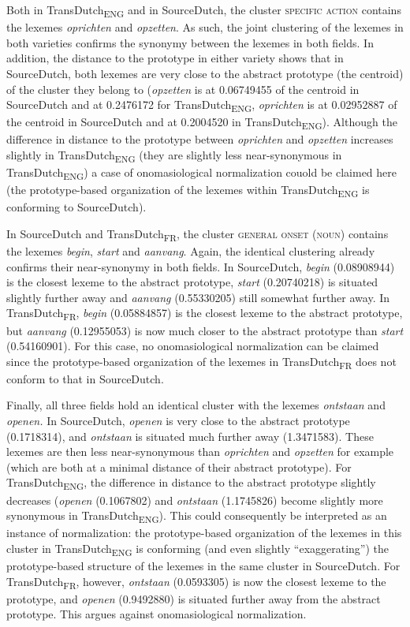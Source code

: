Both in TransDutch\textsubscript{ENG} and in SourceDutch, the cluster {\textsc{specific}} \textsc{action} contains the lexemes \textit{oprichten} and \textit{opzetten}. As such, the joint clustering of the lexemes in both varieties confirms the synonymy between the lexemes in both fields. In addition, the distance to the prototype in either variety shows that in SourceDutch, both lexemes are very close to the abstract prototype (the centroid) of the cluster they belong to (\textit{opzetten} is at 0.06749455 of the centroid in SourceDutch and at 0.2476172 for TransDutch\textsubscript{ENG}, \textit{oprichten} is at 0.02952887 of the centroid in SourceDutch and at 0.2004520 in TransDutch\textsubscript{ENG}). Although the difference in distance to the prototype between \textit{oprichten} and \textit{opzetten} increases slightly in TransDutch\textsubscript{ENG} (they are slightly less near-synonymous in TransDutch\textsubscript{ENG})\textsubscript{} a case of onomasiological normalization couold be claimed here (the prototype-based organization of the lexemes within TransDutch\textsubscript{ENG} is conforming to SourceDutch).

In SourceDutch and TransDutch\textsubscript{FR}, the cluster \textsc{general onset} (\textsc{noun}) contains the lexemes \textit{begin}, \textit{start} and \textit{aanvang}. Again, the identical clustering already confirms their near-synonymy in both fields. In SourceDutch, \textit{begin} (0.08908944) is the closest lexeme to the abstract prototype, \textit{start} (0.20740218) is situated slightly further away and \textit{aanvang} (0.55330205) still somewhat further away. In TransDutch\textsubscript{FR}, \textit{begin} (0.05884857) is the closest lexeme to the abstract prototype, but \textit{aanvang} (0.12955053) is now much closer to the abstract prototype than \textit{start} (0.54160901). For this case, no onomasiological normalization can be claimed since the prototype-based organization of the lexemes in TransDutch\textsubscript{FR} does not conform to that in SourceDutch.

Finally, all three fields hold an identical cluster with the lexemes \textit{ontstaan} and \textit{openen.} In SourceDutch, \textit{openen} is very close to the abstract prototype (0.1718314), and \textit{ontstaan} is situated much further away (1.3471583). These lexemes are then less near-synonymous than \textit{oprichten} and \textit{opzetten} for example (which are both at a minimal distance of their abstract prototype). For TransDutch\textsubscript{ENG}, the difference in distance to the abstract prototype slightly decreases (\textit{openen} (0.1067802) and \textit{ontstaan} (1.1745826) become slightly more synonymous in TransDutch\textsubscript{ENG}). This could consequently be interpreted as an instance of normalization: the prototype-based organization of the lexemes in this cluster in TransDutch\textsubscript{ENG} is conforming (and even slightly ``exaggerating'') the prototype-based structure of the lexemes in the same cluster in SourceDutch. For TransDutch\textsubscript{FR}, however, \textit{ontstaan} (0.0593305) is now the closest lexeme to the prototype, and \textit{openen} (0.9492880) is situated further away from the abstract prototype. This argues against onomasiological normalization.

